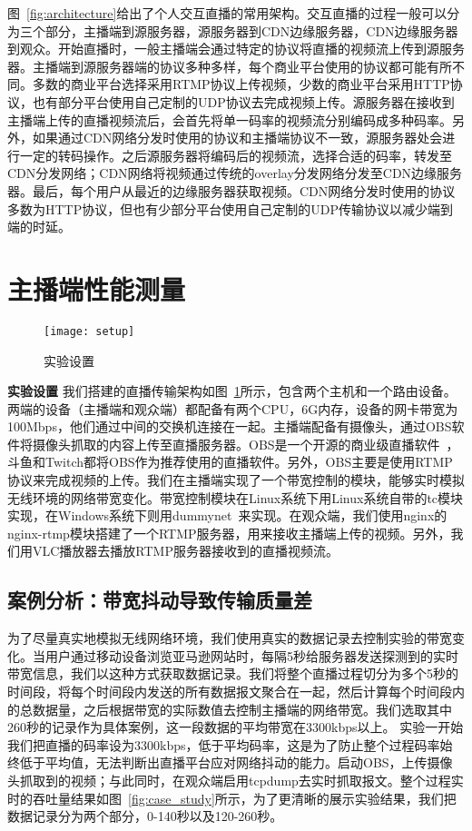 图~\ref{fig:architecture}给出了个人交互直播的常用架构。交互直播的过程一般可以分为三个部分，主播端到源服务器，源服务器到CDN边缘服务器，CDN边缘服务器到观众。开始直播时，一般主播端会通过特定的协议将直播的视频流上传到源服务器。主播端到源服务器端的协议多种多样，每个商业平台使用的协议都可能有所不同。多数的商业平台选择采用RTMP协议上传视频，少数的商业平台采用HTTP协议，也有部分平台使用自己定制的UDP协议去完成视频上传。源服务器在接收到主播端上传的直播视频流后，会首先将单一码率的视频流分别编码成多种码率。另外，如果通过CDN网络分发时使用的协议和主播端协议不一致，源服务器处会进行一定的转码操作。之后源服务器将编码后的视频流，选择合适的码率，转发至CDN分发网络；CDN网络将视频通过传统的overlay分发网络分发至CDN边缘服务器。最后，每个用户从最近的边缘服务器获取视频。CDN网络分发时使用的协议多数为HTTP协议，但也有少部分平台使用自己定制的UDP传输协议以减少端到端的时延。

\section{主播端性能测量}
\begin{figure}[h]%
  \centering
  \texttt{[image: setup]}
  \caption{实验设置}
  \label{fig:setup}
\end{figure}

\textbf{实验设置} 我们搭建的直播传输架构如图~\ref{fig:setup}所示，包含两个主机和一个路由设备。 两端的设备（主播端和观众端）都配备有两个CPU，6G内存，设备的网卡带宽为100Mbps，他们通过中间的交换机连接在一起。主播端配备有摄像头，通过OBS软件将摄像头抓取的内容上传至直播服务器。OBS是一个开源的商业级直播软件~\cite{OBS}，斗鱼和Twitch都将OBS作为推荐使用的直播软件。另外，OBS主要是使用RTMP协议来完成视频的上传。我们在主播端实现了一个带宽控制的模块，能够实时模拟无线环境的网络带宽变化。带宽控制模块在Linux系统下用Linux系统自带的tc模块实现，在Windows系统下则用dummynet~\cite{dummynet}来实现。在观众端，我们使用nginx的nginx-rtmp模块搭建了一个RTMP服务器，用来接收主播端上传的视频。另外，我们用VLC播放器去播放RTMP服务器接收到的直播视频流。

\subsection{案例分析：带宽抖动导致传输质量差}
为了尽量真实地模拟无线网络环境，我们使用真实的数据记录去控制实验的带宽变化。当用户通过移动设备浏览亚马逊网站时，每隔5秒给服务器发送探测到的实时带宽信息，我们以这种方式获取数据记录。我们将整个直播过程切分为多个5秒的时间段，将每个时间段内发送的所有数据报文聚合在一起，然后计算每个时间段内的总数据量，之后根据带宽的实际数值去控制主播端的网络带宽。我们选取其中260秒的记录作为具体案例，这一段数据的平均带宽在3300kbps以上。 实验一开始我们把直播的码率设为3300kbps，低于平均码率，这是为了防止整个过程码率始终低于平均值，无法判断出直播平台应对网络抖动的能力。启动OBS，上传摄像头抓取到的视频；与此同时，在观众端启用tcpdump去实时抓取报文。整个过程实时的吞吐量结果如图~\ref{fig:case_study}所示，为了更清晰的展示实验结果，我们把数据记录分为两个部分，0-140秒以及120-260秒。


